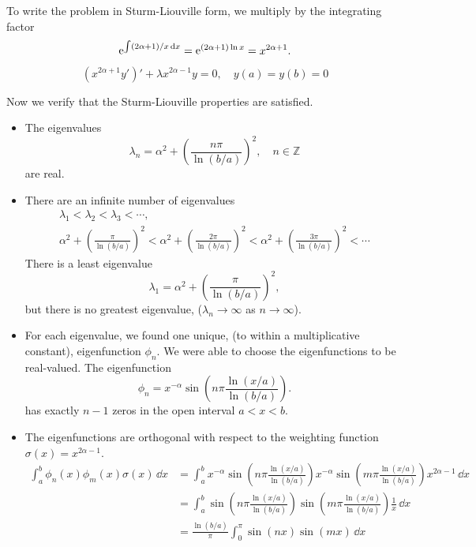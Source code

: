 {\begin{Solution}
  To write the problem in Sturm-Liouville form, we multiply by the integrating
  factor
  \[
  \mathop{\mathrm{e}}\nolimits^{\int (2 \alpha + 1) / x \,\mathrm{d} x} = \mathop{\mathrm{e}}\nolimits^{ (2 \alpha + 1) \ln x }
  = x^{2 \alpha + 1}.
  \]
  \[
  \boxed{
    \left( x^{2 \alpha + 1} y' \right)' + \lambda x^{2 \alpha - 1} y  = 0, 
    \quad y(a) = y(b) = 0
    }
  \]

  Now we verify that the Sturm-Liouville properties are satisfied.
  \begin{itemize}
  \item   
    The eigenvalues 
    \[
    \lambda_n = \alpha^2 + \left( \frac{n \pi}{\ln(b/a)} \right)^2, 
    \quad n \in \mathbb{Z}
    \]
    are real.
  \item   
    There are an infinite number of eigenvalues
    \begin{gather*} 
      \lambda_1 < \lambda_2 < \lambda_3 < \cdots, \\
      \alpha^2 + \left( \frac{\pi}{\ln(b/a)} \right)^2 < 
      \alpha^2 + \left( \frac{2 \pi}{\ln(b/a)} \right)^2 < 
      \alpha^2 + \left( \frac{3 \pi}{\ln(b/a)} \right)^2 < \cdots
    \end{gather*}
    There is a least eigenvalue 
    \[
    \lambda_1 = \alpha^2 + \left( \frac{\pi}{\ln(b/a)} \right)^2,
    \]
    but there is no greatest eigenvalue,
    ($\lambda_n \to \infty$ as $n \to \infty$).
  \item   
    For each eigenvalue, we found one unique, (to within a multiplicative
    constant), eigenfunction $\phi_n$.  We were able to choose the eigenfunctions 
    to be real-valued.   The eigenfunction 
    \[
    \phi_n = x^{-\alpha} \sin \left( n \pi \frac{\ln(x/a)}{\ln(b/a)} \right).
    \]
    has exactly $n-1$ zeros in the open interval $a < x < b$. 
  \item   The eigenfunctions are orthogonal with respect to the weighting
    function $\sigma(x) = x^{2 \alpha - 1}$.
    \begin{align*} 
      \int_a^b \phi_n(x) \phi_m(x) \sigma(x)\,\dd x 
      &= \int_a^b 
      x^{-\alpha} \sin \left( n \pi \frac{\ln(x/a)}{\ln(b/a)} \right)
      x^{-\alpha} \sin \left( m \pi \frac{\ln(x/a)}{\ln(b/a)} \right)
      x^{2 \alpha - 1} \,\dd x \\
      &= \int_a^b 
      \sin \left( n \pi \frac{\ln(x/a)}{\ln(b/a)} \right)
      \sin \left( m \pi \frac{\ln(x/a)}{\ln(b/a)} \right)
      \frac{1}{x} \,\dd x \\
      &= \frac{\ln(b/a)}{\pi} \int_0^\pi \sin(n x) \sin(m x) \,\dd x \\

\end{align*}
\end{itemize}
\end{Solution}}

